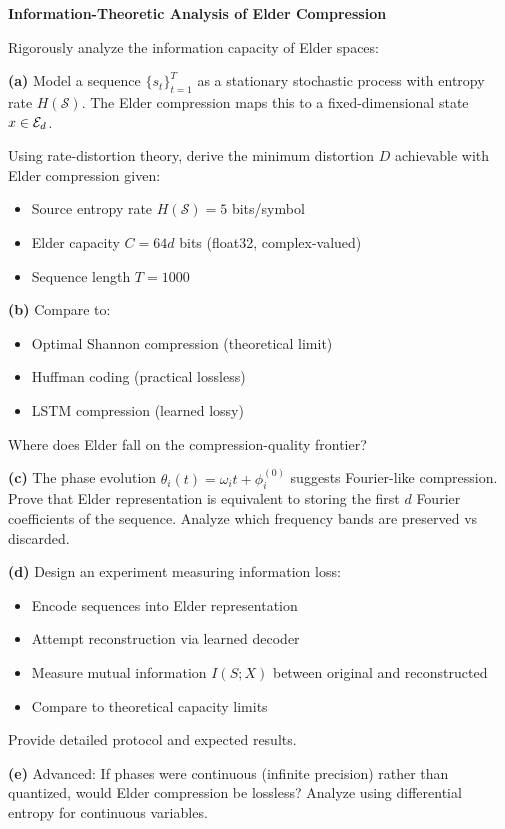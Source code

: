 \begin{challenge}
\textbf{Information-Theoretic Analysis of Elder Compression}

Rigorously analyze the information capacity of Elder spaces:

\textbf{(a)} Model a sequence $\{s_t\}_{t=1}^T$ as a stationary stochastic process with entropy rate $H(\mathcal{S})$. The Elder compression maps this to a fixed-dimensional state $x \in \mathcal{E}_{d}$.

Using rate-distortion theory, derive the minimum distortion $D$ achievable with Elder compression given:
\begin{itemize}
\item Source entropy rate $H(\mathcal{S}) = 5$ bits/symbol
\item Elder capacity $C = 64d$ bits (float32, complex-valued)
\item Sequence length $T = 1000$
\end{itemize}

\textbf{(b)} Compare to:
\begin{itemize}
\item Optimal Shannon compression (theoretical limit)
\item Huffman coding (practical lossless)
\item LSTM compression (learned lossy)
\end{itemize}

Where does Elder fall on the compression-quality frontier?

\textbf{(c)} The phase evolution $\theta_i(t) = \omega_i t + \phi_i^{(0)}$ suggests Fourier-like compression. Prove that Elder representation is equivalent to storing the first $d$ Fourier coefficients of the sequence. Analyze which frequency bands are preserved vs discarded.

\textbf{(d)} Design an experiment measuring information loss:
\begin{itemize}
\item Encode sequences into Elder representation
\item Attempt reconstruction via learned decoder
\item Measure mutual information $I(S; X)$ between original and reconstructed
\item Compare to theoretical capacity limits
\end{itemize}

Provide detailed protocol and expected results.

\textbf{(e)} Advanced: If phases were continuous (infinite precision) rather than quantized, would Elder compression be lossless? Analyze using differential entropy for continuous variables.
\end{challenge}

